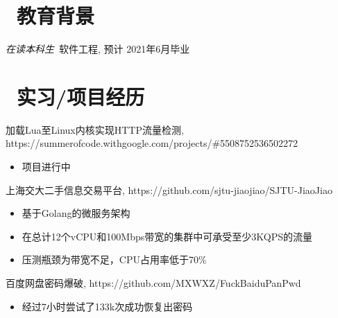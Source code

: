 \documentclass{resume}
\begin{document}



\section{\faGraduationCap\  教育背景}
\textit{在读本科生}\ 软件工程, 预计 2021年6月毕业

\section{\faUsers\ 实习/项目经历}
\begin{onehalfspacing}
    加载Lua至Linux内核实现HTTP流量检测, https://summerofcode.withgoogle.com/projects/\#5508752536502272
    \begin{itemize}
        \item 项目进行中
    \end{itemize}
\end{onehalfspacing}

\begin{onehalfspacing}
    上海交大二手信息交易平台, https://github.com/sjtu-jiaojiao/SJTU-JiaoJiao
    \begin{itemize}
        \item 基于Golang的微服务架构
        \item 在总计12个vCPU和100Mbps带宽的集群中可承受至少3KQPS的流量
        \item 压测瓶颈为带宽不足，CPU占用率低于70\%
    \end{itemize}
\end{onehalfspacing}

\begin{onehalfspacing}
    百度网盘密码爆破, https://github.com/MXWXZ/FuckBaiduPanPwd
    \begin{itemize}
        \item 经过7小时尝试了133k次成功恢复出密码
    \end{itemize}
\end{onehalfspacing}
\end{document}
